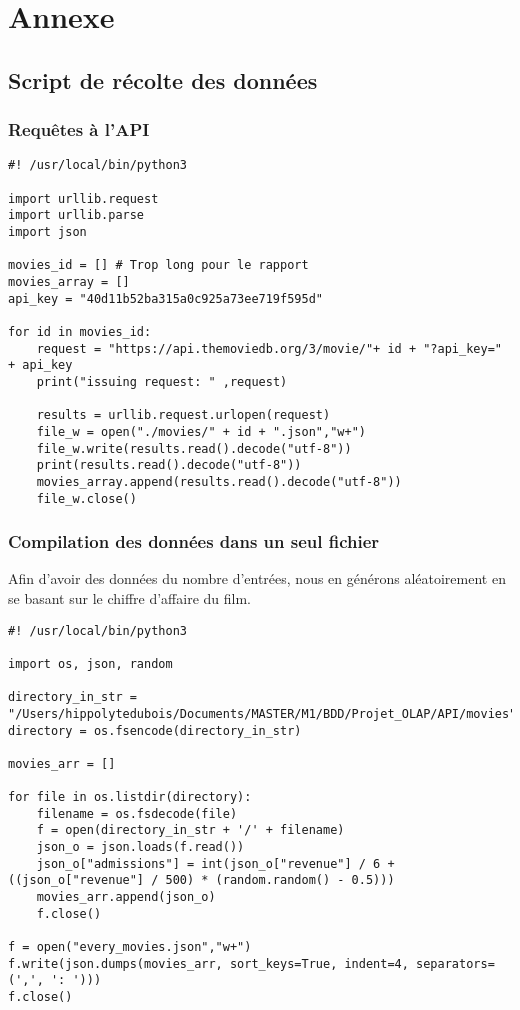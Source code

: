 \chapter{Annexe}

\section{Script de récolte des données}
\subsection{Requêtes à l'API}
\begin{lstlisting}
#! /usr/local/bin/python3

import urllib.request
import urllib.parse
import json

movies_id = [] # Trop long pour le rapport
movies_array = []
api_key = "40d11b52ba315a0c925a73ee719f595d"

for id in movies_id:
	request = "https://api.themoviedb.org/3/movie/"+ id + "?api_key=" + api_key 
	print("issuing request: " ,request)
	
	results = urllib.request.urlopen(request)
	file_w = open("./movies/" + id + ".json","w+")
	file_w.write(results.read().decode("utf-8"))
	print(results.read().decode("utf-8"))
	movies_array.append(results.read().decode("utf-8"))
	file_w.close()
\end{lstlisting}

\subsection{Compilation des données dans un seul fichier}
Afin d'avoir des données du nombre d'entrées, nous en générons aléatoirement en se basant sur le chiffre d'affaire du film.

\begin{lstlisting}
#! /usr/local/bin/python3

import os, json, random

directory_in_str = "/Users/hippolytedubois/Documents/MASTER/M1/BDD/Projet_OLAP/API/movies"
directory = os.fsencode(directory_in_str)

movies_arr = []

for file in os.listdir(directory):
	filename = os.fsdecode(file)
	f = open(directory_in_str + '/' + filename)
	json_o = json.loads(f.read())
	json_o["admissions"] = int(json_o["revenue"] / 6 + ((json_o["revenue"] / 500) * (random.random() - 0.5)))
	movies_arr.append(json_o)
	f.close()

f = open("every_movies.json","w+")
f.write(json.dumps(movies_arr, sort_keys=True, indent=4, separators=(',', ': ')))
f.close()
\end{lstlisting}

